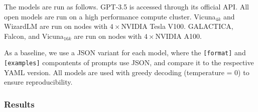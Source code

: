 The models are run as follows. GPT-3.5 is accessed through its official API.
All open models are run on a high performance compute cluster.
Vicuna${}_{4k}$ and WizardLM are run on nodes with $4\times$NVIDIA Tesla V100. %
GALACTICA, Falcon, and Vicuna${}_{16k}$ are run on nodes with $4\times$NVIDIA A100. %

As a baseline, we use a JSON variant for each model, where the \texttt{[format]} and \texttt{[examples]} compontents of prompts use JSON, and compare it to the respective YAML version. All models are used with greedy decoding (temperature = 0) to ensure reproducibility.



\subsubsection{Results}







